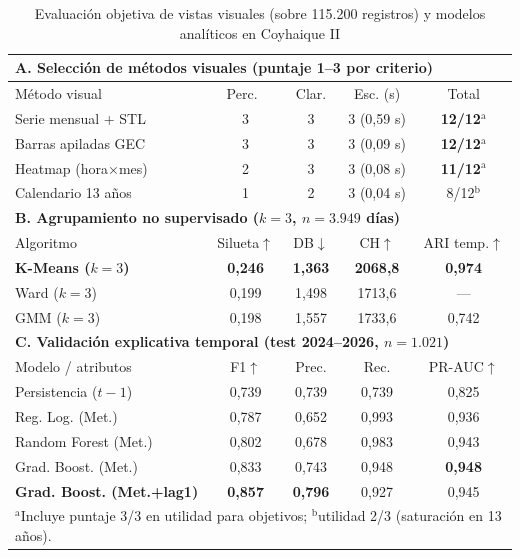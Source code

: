\documentclass[conference]{IEEEtran}
\begin{document}
\begin{table}[t]
\centering
\caption{Evaluaci{\'o}n objetiva de vistas visuales (sobre 115.200 registros) y modelos anal{\'i}ticos en Coyhaique II}
\label{tab:eval}
\scriptsize
\setlength{\tabcolsep}{3.5pt}
\begin{tabular}{@{}lcccc@{}}
\toprule
\multicolumn{5}{l}{\textbf{A. Selecci{\'o}n de m{\'e}todos visuales (puntaje 1--3 por criterio)}} \\
\midrule
M{\'e}todo visual & Perc.~\cite{cleveland1984} & Clar. & Esc. (s) & Total \\
\midrule
Serie mensual + STL & 3 & 3 & 3 (0,59 s) & \textbf{12/12}$^{\mathrm{a}}$ \\
Barras apiladas GEC & 3 & 3 & 3 (0,09 s) & \textbf{12/12}$^{\mathrm{a}}$ \\
Heatmap (hora$\times$mes) & 2 & 3 & 3 (0,08 s) & \textbf{11/12}$^{\mathrm{a}}$ \\
Calendario 13 a{\~n}os & 1 & 2 & 3 (0,04 s) & 8/12$^{\mathrm{b}}$ \\
\midrule
\multicolumn{5}{l}{\textbf{B. Agrupamiento no supervisado ($k=3$, $n=3.949$ d{\'i}as)}} \\
\midrule
Algoritmo & Silueta$\uparrow$ & DB$\downarrow$ & CH$\uparrow$ & ARI temp.$\uparrow$ \\
\midrule
\textbf{K-Means ($k=3$)} & \textbf{0,246} & \textbf{1,363} & \textbf{2068,8} & \textbf{0,974} \\
Ward ($k=3$) & 0,199 & 1,498 & 1713,6 & --- \\
GMM ($k=3$) & 0,198 & 1,557 & 1733,6 & 0,742 \\
\midrule
\multicolumn{5}{l}{\textbf{C. Validaci{\'o}n explicativa temporal (test 2024--2026, $n=1.021$)}} \\
\midrule
Modelo / atributos & F1$\uparrow$ & Prec. & Rec. & PR-AUC$\uparrow$ \\
\midrule
Persistencia ($t-1$) & 0,739 & 0,739 & 0,739 & 0,825 \\
Reg. Log. (Met.) & 0,787 & 0,652 & 0,993 & 0,936 \\
Random Forest (Met.) & 0,802 & 0,678 & 0,983 & 0,943 \\
Grad. Boost. (Met.) & 0,833 & 0,743 & 0,948 & \textbf{0,948} \\
\textbf{Grad. Boost. (Met.+lag1)} & \textbf{0,857} & \textbf{0,796} & 0,927 & 0,945 \\
\bottomrule
\multicolumn{5}{l}{\scriptsize $^{\mathrm{a}}$Incluye puntaje 3/3 en utilidad para objetivos; $^{\mathrm{b}}$utilidad 2/3 (saturaci{\'o}n en 13 a{\~n}os).}
\end{tabular}
\end{table}
\end{document}
